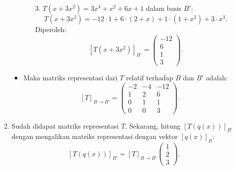 \documentclass[11pt,letterpaper]{article}
\begin{document}
\begin{enumerate}
\begin{enumerate}
\begin{itemize}
\begin{enumerate}
                                3. $T(x+3x^2) = 3x^3 + x^2 + 6x + 1$ dalam basis $B'$:
                                \[
                                  T(x+3x^2) = -12 \cdot 1 + 6 \cdot (2+x) + 1 \cdot (1+x^2) + 3 \cdot x^3.
                                \]
                                Diperoleh:
                                \[
                                  [T(x+3x^2)]_{B'} =
                                  \begin{pmatrix}
                                    -12 \\ 6 \\ 1 \\ 3
                                  \end{pmatrix}.
                                \]

                        \end{enumerate}
                  \item Maka matriks representasi dari $T$ relatif terhadap $B$ dan $B'$ adalah:
                        \[
                          [T]_{B \to B'} =
                          \begin{pmatrix}
                            -2 & -4 & -12 \\
                            1  & 2  & 6   \\
                            0  & 1  & 1   \\
                            0  & 0  & 3
                          \end{pmatrix}.
                        \]
                \end{itemize}
          \item Sudah didapat matriks representasi $T$. Sekarang, hitung $[T(q(x))]_{B'}$ dengan mengalikan matriks representasi dengan vektor $[q(x)]_B$:
                \[
                  [T(q(x))]_{B'} = [T]_{B \to B'}
                  \begin{pmatrix}
                    1 \\ 2 \\ 3
                  \end{pmatrix}.
                \]


\end{enumerate}
\end{enumerate}
\end{document}
